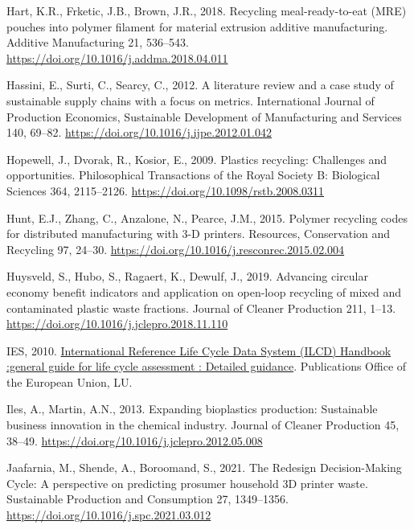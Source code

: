 \documentclass[12pt]{elsarticle} %
\newlength{\cslhangindent}
\newlength{\cslentryspacingunit} %
\newenvironment{CSLReferences}[2] %
 {%
  \setlength{\parindent}{0pt}
  \ifodd #1
  \let\oldpar\par
  \def\par{\hangindent=\cslhangindent\oldpar}
  \fi
  \setlength{\parskip}{#2\cslentryspacingunit}
 }%
 {}
\begin{document}
\begin{CSLReferences}{1}{0}
\leavevmode{}%
Hart, K.R., Frketic, J.B., Brown, J.R., 2018. Recycling meal-ready-to-eat ({MRE}) pouches into polymer filament for material extrusion additive manufacturing. Additive Manufacturing 21, 536--543. \url{https://doi.org/10.1016/j.addma.2018.04.011}

\leavevmode{}%
Hassini, E., Surti, C., Searcy, C., 2012. A literature review and a case study of sustainable supply chains with a focus on metrics. International Journal of Production Economics, Sustainable {Development} of {Manufacturing} and {Services} 140, 69--82. \url{https://doi.org/10.1016/j.ijpe.2012.01.042}

\leavevmode{}%
Hopewell, J., Dvorak, R., Kosior, E., 2009. Plastics recycling: Challenges and opportunities. Philosophical Transactions of the Royal Society B: Biological Sciences 364, 2115--2126. \url{https://doi.org/10.1098/rstb.2008.0311}

\leavevmode{}%
Hunt, E.J., Zhang, C., Anzalone, N., Pearce, J.M., 2015. Polymer recycling codes for distributed manufacturing with 3-{D} printers. Resources, Conservation and Recycling 97, 24--30. \url{https://doi.org/10.1016/j.resconrec.2015.02.004}

\leavevmode{}%
Huysveld, S., Hubo, S., Ragaert, K., Dewulf, J., 2019. Advancing circular economy benefit indicators and application on open-loop recycling of mixed and contaminated plastic waste fractions. Journal of Cleaner Production 211, 1--13. \url{https://doi.org/10.1016/j.jclepro.2018.11.110}

\leavevmode{}%
IES, 2010. \href{https://data.europa.eu/doi/10.2788/38479}{International {Reference Life Cycle Data System} ({ILCD}) {Handbook} :general guide for life cycle assessment : Detailed guidance}. {Publications Office of the European Union}, {LU}.

\leavevmode{}%
Iles, A., Martin, A.N., 2013. Expanding bioplastics production: Sustainable business innovation in the chemical industry. Journal of Cleaner Production 45, 38--49. \url{https://doi.org/10.1016/j.jclepro.2012.05.008}

\leavevmode{}%
Jaafarnia, M., Shende, A., Boroomand, S., 2021. The {Redesign Decision-Making Cycle}: {A} perspective on predicting prosumer household {3D} printer waste. Sustainable Production and Consumption 27, 1349--1356. \url{https://doi.org/10.1016/j.spc.2021.03.012}


\end{CSLReferences}
\end{document}
